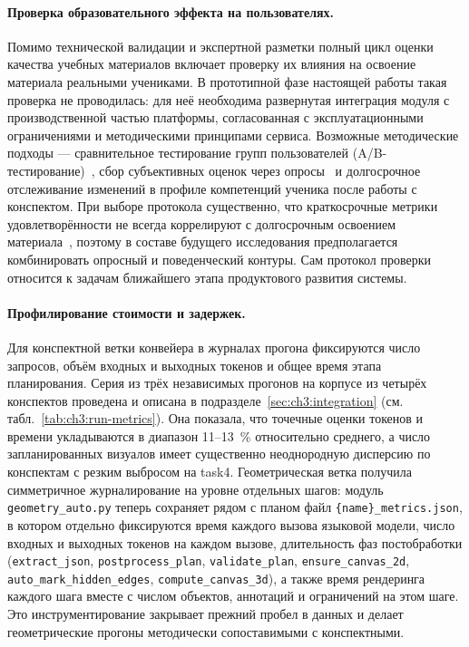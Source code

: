\paragraph{Проверка образовательного эффекта на пользователях.} Помимо технической валидации и экспертной разметки полный цикл оценки качества учебных материалов включает проверку их влияния на освоение материала реальными учениками. В прототипной фазе настоящей работы такая проверка не проводилась: для неё необходима развернутая интеграция модуля с производственной частью платформы, согласованная с эксплуатационными ограничениями и методическими принципами сервиса. Возможные методические подходы --- сравнительное тестирование групп пользователей (A/B\nobreakdash-тестирование)~\cite{Kohavi2009,Chen2016MOOCAB}, сбор субъективных оценок через опросы~\cite{VanDerLee2019} и долгосрочное отслеживание изменений в профиле компетенций ученика после работы с конспектом. При выборе протокола существенно, что краткосрочные метрики удовлетворённости не всегда коррелируют с долгосрочным освоением материала~\cite{VanLehn2011}, поэтому в составе будущего исследования предполагается комбинировать опросный и поведенческий контуры. Сам протокол проверки относится к задачам ближайшего этапа продуктового развития системы.

\paragraph{Профилирование стоимости и задержек.} Для конспектной ветки конвейера в журналах прогона фиксируются число запросов, объём входных и выходных токенов и общее время этапа планирования. Серия из трёх независимых прогонов на корпусе из четырёх конспектов проведена и описана в подразделе~\ref{sec:ch3:integration} (см. табл.~\ref{tab:ch3:run-metrics}). Она показала, что точечные оценки токенов и времени укладываются в диапазон 11--13~\% относительно среднего, а число запланированных визуалов имеет существенно неоднородную дисперсию по конспектам с резким выбросом на task4. Геометрическая ветка получила симметричное журналирование на уровне отдельных шагов: модуль \texttt{geometry\_auto.py} теперь сохраняет рядом с планом файл \texttt{\{name\}\_metrics.json}, в котором отдельно фиксируются время каждого вызова языковой модели, число входных и выходных токенов на каждом вызове, длительность фаз постобработки (\texttt{extract\_json}, \texttt{postprocess\_plan}, \texttt{validate\_plan}, \texttt{ensure\_canvas\_2d}, \texttt{auto\_mark\_hidden\_edges}, \texttt{compute\_canvas\_3d}), а также время рендеринга каждого шага вместе с числом объектов, аннотаций и ограничений на этом шаге. Это инструментирование закрывает прежний пробел в данных и делает геометрические прогоны методически сопоставимыми с конспектными.

